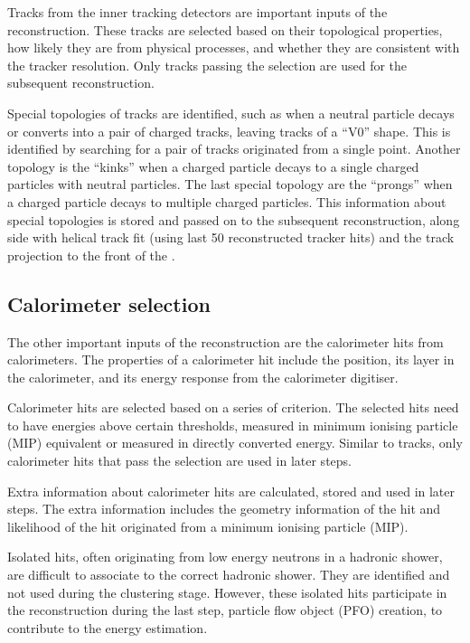 Tracks from the inner tracking detectors are important inputs of the \pandora reconstruction. These tracks are selected based on their topological properties, how likely they are from physical processes, and whether they are consistent with the tracker resolution. Only tracks passing the selection are used for the subsequent reconstruction.

Special topologies of tracks are identified, such as when a neutral particle decays or converts into a pair of charged tracks, leaving tracks of a ``V0''  shape. This is identified by searching for a pair of tracks originated from a single point. Another topology is the ``kinks'' when a charged particle decays to a single charged particles with neutral particles. The last special topology are  the ``prongs'' when a charged particle decays to multiple charged particles. This information about special topologies is stored and passed on to the subsequent reconstruction, along side with helical track fit (using last 50 reconstructed tracker hits) and the track projection to the front of the \ECAL.

\subsection{Calorimeter selection}

The other important inputs of  the \pandora reconstruction are the calorimeter hits from calorimeters. The properties of a calorimeter hit include the position, its layer in the calorimeter, and its energy response from the calorimeter digitiser.

Calorimeter hits are selected based on a series of criterion. The selected hits need to have energies above certain thresholds, measured in minimum ionising particle (MIP) equivalent or measured in directly converted energy. Similar to tracks, only calorimeter hits that pass the selection are used in later steps.

Extra information about calorimeter hits are calculated, stored and used in later steps. The extra information includes the geometry information of the hit and likelihood of the hit originated from a minimum ionising particle (MIP).

Isolated hits, often originating from low energy neutrons in a hadronic shower, are difficult to associate to the correct hadronic shower. They are identified and not used during the clustering stage. However, these isolated hits participate in the reconstruction during the  last step, particle flow object (PFO) creation, to contribute to the energy estimation.



